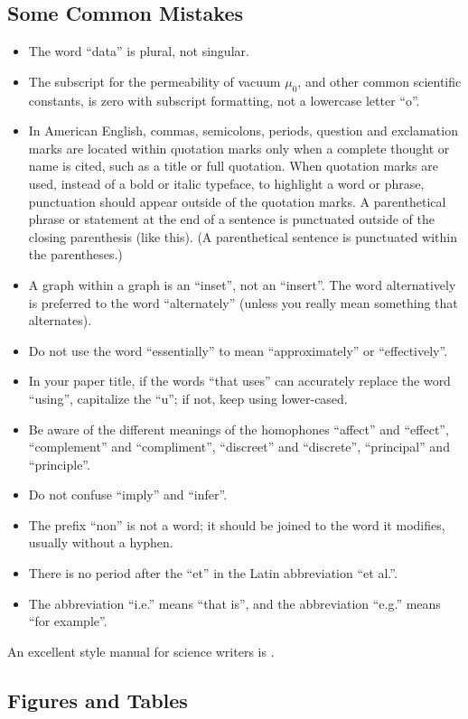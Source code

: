\documentclass[conference,onecolumn,11pt]{IEEEtran}
\begin{document}
\subsection{Some Common Mistakes}\label{SCM}
\begin{itemize}
\item The word ``data'' is plural, not singular.
\item The subscript for the permeability of vacuum $\mu_{0}$, and other common scientific constants, is zero with subscript formatting, not a lowercase letter ``o''.
\item In American English, commas, semicolons, periods, question and exclamation marks are located within quotation marks only when a complete thought or name is cited, such as a title or full quotation. When quotation marks are used, instead of a bold or italic typeface, to highlight a word or phrase, punctuation should appear outside of the quotation marks. A parenthetical phrase or statement at the end of a sentence is punctuated outside of the closing parenthesis (like this). (A parenthetical sentence is punctuated within the parentheses.)
\item A graph within a graph is an ``inset'', not an ``insert''. The word alternatively is preferred to the word ``alternately'' (unless you really mean something that alternates).
\item Do not use the word ``essentially'' to mean ``approximately'' or ``effectively''.
\item In your paper title, if the words ``that uses'' can accurately replace the word ``using'', capitalize the ``u''; if not, keep using lower-cased.
\item Be aware of the different meanings of the homophones ``affect'' and ``effect'', ``complement'' and ``compliment'', ``discreet'' and ``discrete'', ``principal'' and ``principle''.
\item Do not confuse ``imply'' and ``infer''.
\item The prefix ``non'' is not a word; it should be joined to the word it modifies, usually without a hyphen.
\item There is no period after the ``et'' in the Latin abbreviation ``et al.''.
\item The abbreviation ``i.e.'' means ``that is'', and the abbreviation ``e.g.'' means ``for example''.
\end{itemize}
An excellent style manual for science writers is \cite{b7}.


\subsection{Figures and Tables}
\end{document}
